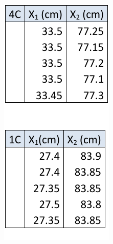 \documentclass{scrreprt}
\begin{document}
\begin{figure}[H]
        \centering
        \begin{subfigure}[b]{0.3\textwidth}
                \centering
                \includegraphics[width=\textwidth]{diag/one_lens.pdf}

\end{subfigure}
\end{figure}
\end{document}
